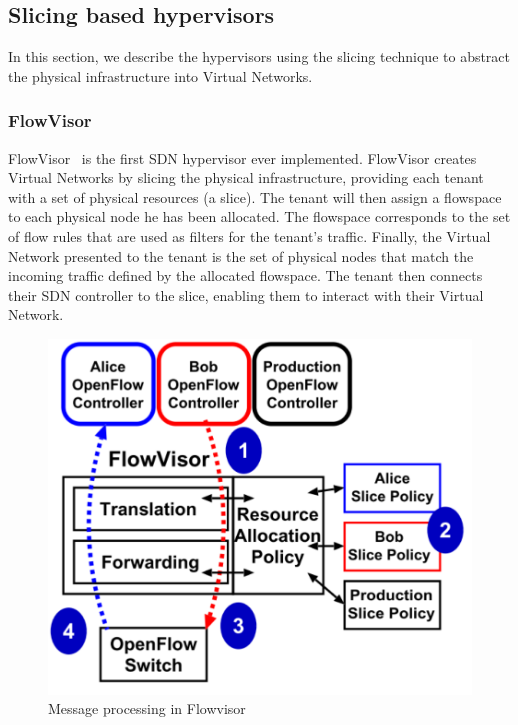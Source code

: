 \subsection{Slicing based hypervisors}
\label{sec:existing-nhv}
In this section, we describe the hypervisors using the slicing technique to abstract the physical infrastructure into Virtual Networks.

\subsubsection{FlowVisor}

FlowVisor~\cite{FlowVisor-Sherwood2009} is the first SDN hypervisor ever implemented.
FlowVisor creates Virtual Networks by slicing the physical infrastructure, providing each tenant with a set of physical resources (\ie a slice).
The tenant will then assign a flowspace to each physical node he has been allocated.
The flowspace corresponds to the set of flow rules that are used as filters for the tenant's traffic.
Finally, the Virtual Network presented to the tenant is the set of physical nodes that match the incoming traffic defined by the allocated flowspace.
The tenant then connects their SDN controller to the slice, enabling them to interact with their Virtual Network.



\begin{figure}[ht]
    \centering
    \includegraphics[scale=0.6]{figures/flowvisor-process.pdf}
    \caption{Message processing in Flowvisor~\cite{FlowVisor-Sherwood2009}}
    \label{fig:flowvisor-process}
\end{figure}

